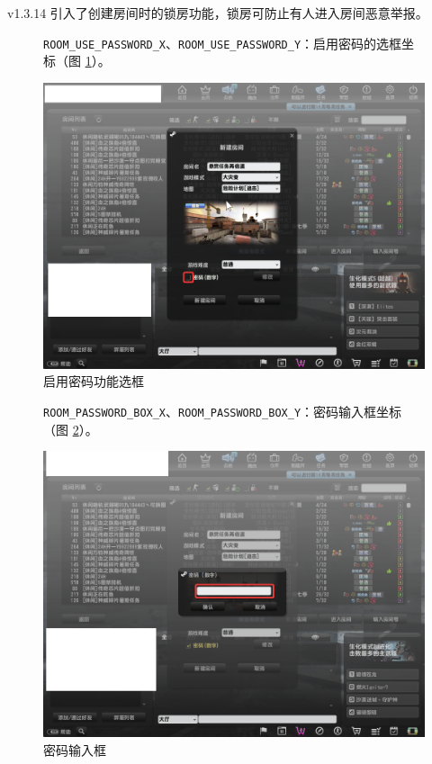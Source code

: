v1.3.14 引入了创建房间时的锁房功能，锁房可防止有人进入房间恶意举报。

\begin{figure}[H]
    \Centering
    \parbox[l]{\textwidth}{\lstinline{ROOM_USE_PASSWORD_X}、\lstinline{ROOM_USE_PASSWORD_Y}：启用密码的选框坐标（图 \ref{ch2fig-use-password}）。}
    \includegraphics[width=\textwidth]{docs/assets/use_password.png}
    \caption{启用密码功能选框}
    \label{ch2fig-use-password}
\end{figure}

\begin{figure}[H]
    \Centering
    \parbox[l]{\textwidth}{\lstinline{ROOM_PASSWORD_BOX_X}、\lstinline{ROOM_PASSWORD_BOX_Y}：密码输入框坐标（图 \ref{ch2fig-password-box}）。}
    \includegraphics[width=\textwidth]{docs/assets/password_box.png}
    \caption{密码输入框}
    \label{ch2fig-password-box}
\end{figure}

